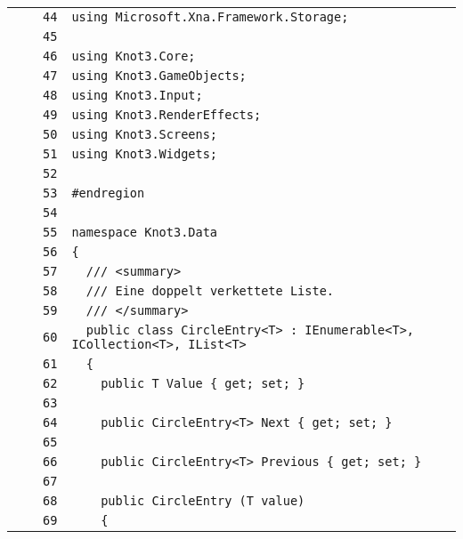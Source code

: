 \documentclass[a4paper,10pt]{article}
\begin{document}
\begin{longtable}[l]{lrrl}
\cellcolor{gray} &  & \verb~44~ & \verb~using Microsoft.Xna.Framework.Storage;~\\
\cellcolor{gray} &  & \verb~45~ & \verb~~\\
\cellcolor{gray} &  & \verb~46~ & \verb~using Knot3.Core;~\\
\cellcolor{gray} &  & \verb~47~ & \verb~using Knot3.GameObjects;~\\
\cellcolor{gray} &  & \verb~48~ & \verb~using Knot3.Input;~\\
\cellcolor{gray} &  & \verb~49~ & \verb~using Knot3.RenderEffects;~\\
\cellcolor{gray} &  & \verb~50~ & \verb~using Knot3.Screens;~\\
\cellcolor{gray} &  & \verb~51~ & \verb~using Knot3.Widgets;~\\
\cellcolor{gray} &  & \verb~52~ & \verb~~\\
\cellcolor{gray} &  & \verb~53~ & \verb~#endregion~\\
\cellcolor{gray} &  & \verb~54~ & \verb~~\\
\cellcolor{gray} &  & \verb~55~ & \verb~namespace Knot3.Data~\\
\cellcolor{gray} &  & \verb~56~ & \verb~{~\\
\cellcolor{gray} &  & \verb~57~ & \verb~  /// <summary>~\\
\cellcolor{gray} &  & \verb~58~ & \verb~  /// Eine doppelt verkettete Liste.~\\
\cellcolor{gray} &  & \verb~59~ & \verb~  /// </summary>~\\
\cellcolor{gray} &  & \verb~60~ & \verb~  public class CircleEntry<T> : IEnumerable<T>, ICollection<T>, IList<T>~\\
\cellcolor{gray} &  & \verb~61~ & \verb~  {~\\
\cellcolor{gray} &  & \verb~62~ & \verb~    public T Value { get; set; }~\\
\cellcolor{gray} &  & \verb~63~ & \verb~~\\
\cellcolor{gray} &  & \verb~64~ & \verb~    public CircleEntry<T> Next { get; set; }~\\
\cellcolor{gray} &  & \verb~65~ & \verb~~\\
\cellcolor{gray} &  & \verb~66~ & \verb~    public CircleEntry<T> Previous { get; set; }~\\
\cellcolor{gray} &  & \verb~67~ & \verb~~\\
\cellcolor{gray} &  & \verb~68~ & \verb~    public CircleEntry (T value)~\\
\cellcolor{gray} &  & \verb~69~ & \verb~    {~\\

\end{longtable}
\end{document}
